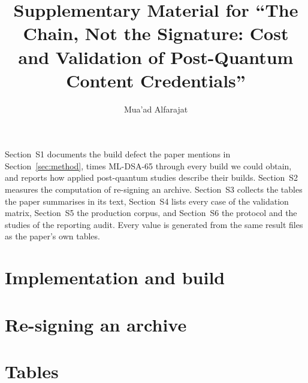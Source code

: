 \documentclass[acmsmall,screen,nonacm]{acmart}
\begin{document}
\title[Supplement: The Chain, Not the Signature]{Supplementary Material for ``The Chain, Not the Signature: Cost and Validation of Post-Quantum Content Credentials''}
\author{Mua'ad Alfarajat}
\maketitle

Section~S1 documents the build defect the paper mentions in
Section~\ref{sec:method}, times ML-DSA-65 through every build we could obtain,
and reports how applied post-quantum studies describe their builds.
Section~S2 measures the computation of re-signing an archive. Section~S3
collects the tables the paper summarises in its text, Section~S4 lists every
case of the validation matrix, Section~S5 the production corpus, and
Section~S6 the protocol and the studies of the reporting audit. Every value is
generated from the same result files as the paper's own tables.

\section{Implementation and build}
\label{sec:supp-impl}



\clearpage
\section{Re-signing an archive}
\label{sec:supp-archive}




\clearpage
\section{Tables}
\label{sec:supp-tables}
\end{document}
